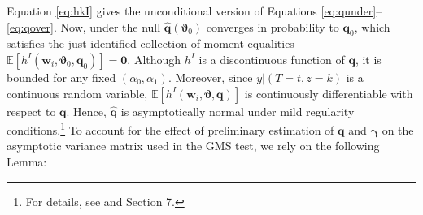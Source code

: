 Equation \ref{eq:hkI} gives the unconditional version of Equations \ref{eq:qunder}--\ref{eq:qover}.
Now, under the null $\widehat{\mathbf{q}}(\boldsymbol{\vartheta}_0)$ converges in probability to $\mathbf{q}_0$, which satisfies the just-identified collection of moment equalities $\mathbb{E}[h^I(\mathbf{w}_i, \boldsymbol{\vartheta}_0,\mathbf{q}_0)] = \mathbf{0}$.
Although $h^I$ is a discontinuous function of $\mathbf{q}$, it is bounded for any fixed $(\alpha_0, \alpha_1)$.
Moreover, since $y|(T=t,z=k)$ is a continuous random variable, $\mathbb{E}[h^I(\mathbf{w}_i,\boldsymbol{\vartheta}, \mathbf{q})]$ is continuously differentiable with respect to $\mathbf{q}$.
Hence, $\widehat{\mathbf{q}}$ is asymptotically normal under mild regularity conditions.\footnote{For details, see \cite{andrews1994empirical} and \cite{newey1994large} Section 7.}
To account for the effect of preliminary estimation of $\mathbf{q}$ and $\boldsymbol{\gamma}$ on the asymptotic variance matrix used in the GMS test, we rely on the following Lemma:

